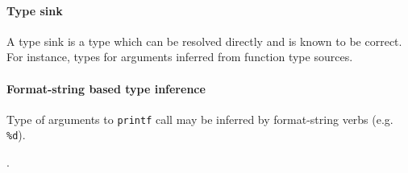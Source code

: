 
\paragraph{Type sink}

A type sink is a type which can be resolved directly and is known to be correct. For instance, types for arguments inferred from function type sources.


\paragraph{Format-string based type inference}


Type of arguments to \texttt{printf} call may be inferred by format-string verbs (e.g. \texttt{\%d}).

.
